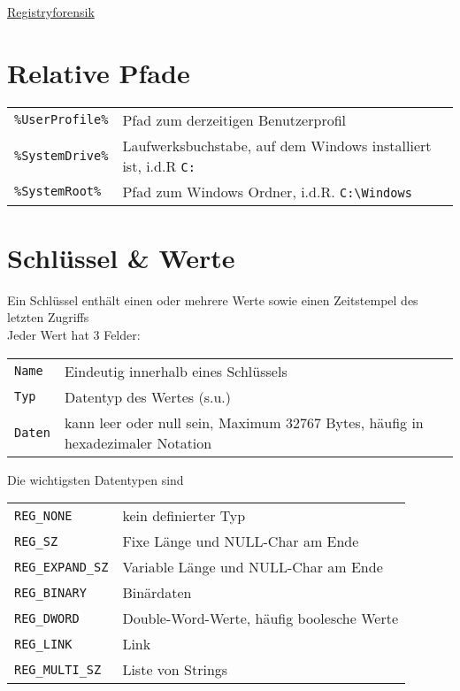\begin{center}
     \Large{\underline{Registryforensik}} \\
\end{center}

\section{Relative Pfade}
\begin{tabular}{@{}p{\the\MyLen}%
				@{}p{\linewidth-\the\MyLen}@{}}
\texttt{\%UserProfile\%} & Pfad zum derzeitigen Benutzerprofil \\
\texttt{\%SystemDrive\%} & Laufwerksbuchstabe, auf dem Windows 
							installiert ist, i.d.R \texttt{C:} \\
\texttt{\%SystemRoot\%} & Pfad zum Windows Ordner, i.d.R. \texttt{C:\textbackslash Windows}
\end{tabular}	

\section{Schlüssel \& Werte}
Ein Schlüssel enthält einen oder mehrere Werte sowie einen Zeitstempel des letzten Zugriffs\\
Jeder Wert hat 3 Felder:
\settowidth{\MyLen}{value.fields.}
\begin{tabular}{@{}p{\the\MyLen}%
		@{}p{\linewidth-\the\MyLen}@{}}
	\texttt{Name} & Eindeutig innerhalb eines Schlüssels\\
	\texttt{Typ} & Datentyp des Wertes (s.u.)\\
	\texttt{Daten} & kann leer oder null sein, Maximum 32767 Bytes, häufig in hexadezimaler Notation\\
\end{tabular}
Die wichtigsten Datentypen sind
\settowidth{\MyLen}{Reg.Expand.leng}
\begin{tabular}{@{}p{\the\MyLen}%
		@{}p{\linewidth-\the\MyLen}@{}}
	\texttt{REG\_NONE} & kein definierter Typ\\
	\texttt{REG\_SZ} & Fixe Länge und NULL-Char am Ende\\
	\texttt{REG\_EXPAND\_SZ} & Variable Länge und NULL-Char am Ende\\
	\texttt{REG\_BINARY} & Binärdaten\\
	\texttt{REG\_DWORD} & Double-Word-Werte, häufig boolesche Werte\\
	\texttt{REG\_LINK} & Link\\
	\texttt{REG\_MULTI\_SZ} & Liste von Strings\\
\end{tabular}


